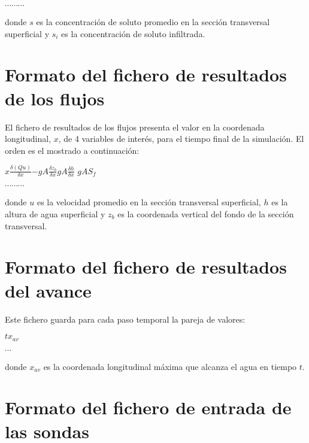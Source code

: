 \documentclass[a4paper,12pt]{report}
\begin{document}
\hspace{3.8cm} $\cdots \cdots \cdots$

\noindent donde $s$ es la concentración de soluto promedio en la sección transversal superficial y $s_i$ es la concentración de soluto infiltrada.

\section{Formato del fichero de resultados de los flujos}
El fichero de resultados de los flujos presenta el valor en la coordenada longitudinal, $x$, de 4 variables de interés, para el tiempo final de la simulación. El orden es el mostrado a continuación:

\hspace{1.8cm}$x$\hspace{0.9cm}$\frac{\delta(Qu)}{\delta x}$\hspace{0.9cm}$-gA\frac{\delta z_b}{\delta x}$\hspace{0.9cm}$gA\frac{\delta h}{\delta x}$
\hspace{0.9cm}$gAS_f$ 

\hspace{3.8cm} $\cdots \cdots \cdots$

\noindent donde $u$ es la velocidad promedio en la sección transversal superficial, $h$ es la altura de agua superficial y $z_b$ es la 
coordenada vertical del fondo de la sección transversal. 

\section{Formato del fichero de resultados del avance}

Este fichero guarda para cada paso temporal la pareja de valores:

\hspace{1.8cm}$t$\hspace{0.9cm}$x_{av}$

\hspace{1.8cm} $\cdots$

\noindent donde $x_{av}$ es la coordenada longitudinal máxima que alcanza el agua en tiempo $t$.
 


\section{Formato del fichero de entrada de las sondas}
 
\end{document}
